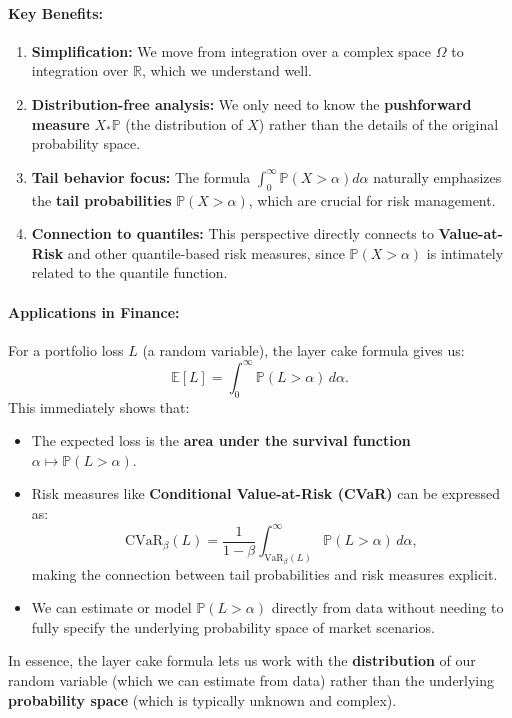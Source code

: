 \documentclass[11pt]{amsart}
\begin{document}
\paragraph{Key Benefits:}
\begin{enumerate}[noitemsep,left=0pt]
	\item \textbf{Simplification:} We move from integration over a complex space $\Omega$ to integration over $\mathbb{R}$, which we understand well.
	\item \textbf{Distribution-free analysis:} We only need to know the \textbf{pushforward measure} $X_*\mathbb{P}$ (the distribution of $X$) rather than the details of the original probability space.
	\item \textbf{Tail behavior focus:} The formula $\int_0^\infty \mathbb{P}(X > \alpha) d\alpha$ naturally emphasizes the \textbf{tail probabilities} $\mathbb{P}(X > \alpha)$, which are crucial for risk management.
	\item \textbf{Connection to quantiles:} This perspective directly connects to \textbf{Value-at-Risk} and other quantile-based risk measures, since $\mathbb{P}(X > \alpha)$ is intimately related to the quantile function.
\end{enumerate}

\paragraph{Applications in Finance:}
For a portfolio loss $L$ (a random variable), the layer cake formula gives us:
\[
	\mathbb{E}[L] = \int_0^\infty \mathbb{P}(L > \alpha) \, d\alpha.
\]
This immediately shows that:
\begin{itemize}
	\item The expected loss is the \textbf{area under the survival function} $\alpha \mapsto \mathbb{P}(L > \alpha)$.
	\item Risk measures like \textbf{Conditional Value-at-Risk (CVaR)} can be expressed as:
	      \[
		      \text{CVaR}_\beta(L) = \frac{1}{1-\beta} \int_{\text{VaR}_\beta(L)}^\infty \mathbb{P}(L > \alpha) \, d\alpha,
	      \]
	      making the connection between tail probabilities and risk measures explicit.
	\item We can estimate or model $\mathbb{P}(L > \alpha)$ directly from data without needing to fully specify the underlying probability space of market scenarios.
\end{itemize}

In essence, the layer cake formula lets us work with the \textbf{distribution} of our random variable (which we can estimate from data) rather than the underlying \textbf{probability space} (which is typically unknown and complex).
\end{document}
